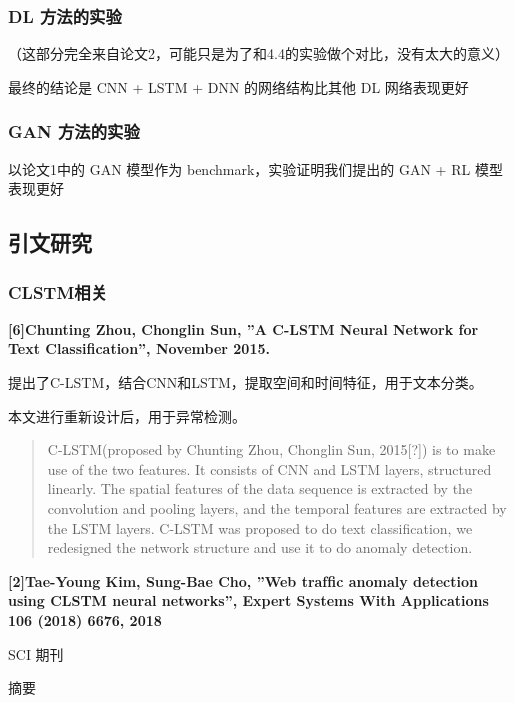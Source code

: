 \documentclass[12pt]{article}
\begin{document}
\subsubsection{DL 方法的实验}
（这部分完全来自论文2，可能只是为了和4.4的实验做个对比，没有太大的意义）

最终的结论是 CNN + LSTM + DNN 的网络结构比其他 DL 网络表现更好

\subsubsection{GAN 方法的实验}
以论文1中的 GAN 模型作为 benchmark，实验证明我们提出的 GAN + RL 模型表现更好

\newpage
\subsection{\textbf{引文研究}}

\subsubsection{CLSTM相关}\label{header-n516}

\textbf{{[}6{]}Chunting Zhou, Chonglin Sun, ''A C-LSTM Neural Network
for Text Classiﬁcation'', November 2015.}

提出了C-LSTM，结合CNN和LSTM，提取空间和时间特征，用于文本分类。

本文进行重新设计后，用于异常检测。

\begin{quote}
C-LSTM(proposed by Chunting Zhou, Chonglin Sun, 2015{[}?{]}) is to make
use of the two features. It consists of CNN and LSTM layers, structured
linearly. The spatial features of the data sequence is extracted by the
convolution and pooling layers, and the temporal features are extracted
by the LSTM layers. C-LSTM was proposed to do text classiﬁcation, we
redesigned the network structure and use it to do anomaly detection.
\end{quote}

\textbf{{[}2{]}Tae-Young Kim, Sung-Bae Cho, ''Web trafﬁc anomaly
detection using CLSTM neural networks'', Expert Systems With
Applications 106 (2018) 6676, 2018}

SCI 期刊

摘要
\end{document}
